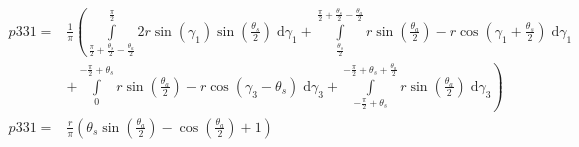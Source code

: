 \begin{align}
    p331 =&\frac{1}{\pi} \left(\int\limits_{\frac{\pi}{2} + \frac{\theta_{s}}{2} - \frac{\theta_{a}}{2}}^{\frac{\pi}{2}}2 r \sin{\left (\gamma_{1} \right )} \sin{\left (\frac{\theta_{s}}{2} \right )}\;\mathrm{d}\gamma_{1}+\int\limits_{\frac{\theta_{s}}{2}}^{\frac{\pi}{2} + \frac{\theta_{s}}{2} - \frac{\theta_{a}}{2}}r \sin{\left (\frac{\theta_{a}}{2} \right )} - r \cos{\left (\gamma_{1} + \frac{\theta_{s}}{2} \right )}\;\mathrm{d}\gamma_{1}\right.\\
 &\left.+\int\limits_{0}^{- \frac{\pi}{2} + \theta_{s}}r \sin{\left (\frac{\theta_{a}}{2} \right )} - r \cos{\left (\gamma_{3} - \theta_{s} \right )}\;\mathrm{d}\gamma_{3}+\int\limits_{- \frac{\pi}{2} + \theta_{s}}^{- \frac{\pi}{2} + \theta_{s} + \frac{\theta_{a}}{2}}r \sin{\left (\frac{\theta_{a}}{2} \right )}\;\mathrm{d}\gamma_{3}\right)\\
    p331 =& \frac{r}{\pi} \left(\theta_{s} \sin{\left (\frac{\theta_{a}}{2} \right )} - \cos{\left (\frac{\theta_{a}}{2} \right )} + 1\right)
\end{align}